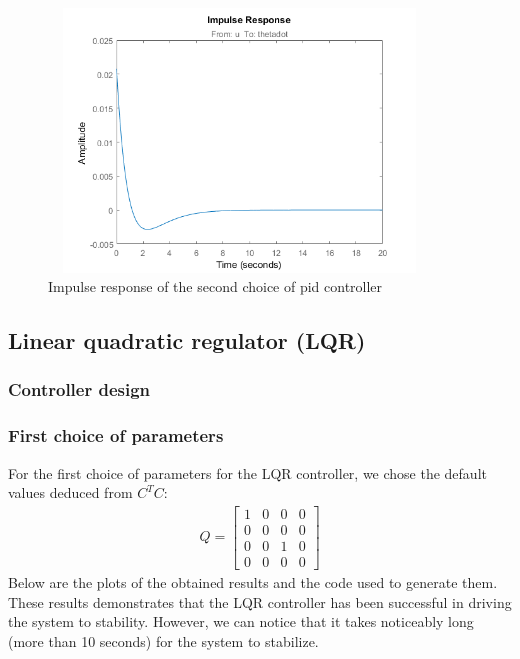\documentclass [12pt,letterpaper]{exam}
\begin{document}
\begin{figure}[H]
  \centering
    \includegraphics[width=10.15cm, height=7cm]{pid2_impulse} 
  \caption{Impulse response of the second choice of pid controller}
  \label{fig:pid2_impulse}
\end{figure}



\subsection{Linear quadratic regulator (LQR)}
\subsubsection{Controller design}

\subsubsection{First choice of parameters}
For the first choice of parameters for the LQR controller, we chose the default values deduced from $C^TC$:
\begin{align}
Q = \begin{bmatrix}
1 & 0 & 0 & 0 \\
0 & 0 & 0 & 0 \\
0 & 0 & 1 & 0 \\
0 & 0 & 0 & 0
\end{bmatrix}
\end{align}
Below are the plots of the obtained results and the code used to generate them. These results demonstrates that the LQR controller has been successful in driving the system to stability. However, we can notice that it takes noticeably long (more than 10 seconds) for the system to stabilize.
\end{document}
